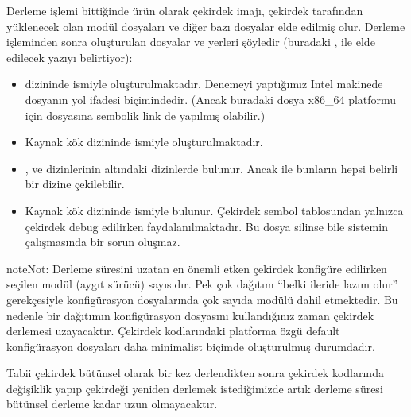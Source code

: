 \documentclass[a4paper,10pt,turkish]{sphinxmanual}
\begin{document}
\sphinxAtStartPar
Derleme işlemi bittiğinde ürün olarak çekirdek imajı, çekirdek tarafından yüklenecek olan modül
dosyaları ve diğer bazı dosyalar elde edilmiş olur. Derleme işleminden sonra oluşturulan dosyalar
ve yerleri şöyledir (buradaki ,  ile elde edilecek yazıyı
belirtiyor):
\begin{itemize}
\item {} 
\sphinxAtStartPar
{}  dizininde  ismiyle
oluşturulmaktadır. Denemeyi yaptığımız Intel makinede dosyanın yol ifadesi
 biçimindedir. (Ancak buradaki dosya x86\_64 platformu için
 dosyasına sembolik link de yapılmış olabilir.)

\item {} 
\sphinxAtStartPar
{} Kaynak kök dizininde  ismiyle
oluşturulmaktadır.

\item {} 
\sphinxAtStartPar
{} ,  ve  dizinlerinin
altındaki dizinlerde bulunur. Ancak  ile bunların hepsi belirli bir
dizine çekilebilir.

\item {} 
\sphinxAtStartPar
{} Kaynak kök dizininde  ismiyle bulunur. Çekirdek sembol
tablosundan yalnızca çekirdek debug edilirken faydalanılmaktadır. Bu dosya silinse bile sistemin
çalışmasında bir sorun oluşmaz.

\end{itemize}

\begin{sphinxadmonition}{note}{Not:}
\sphinxAtStartPar
Derleme süresini uzatan en önemli etken çekirdek konfigüre edilirken seçilen modül (aygıt sürücü)
sayısıdır. Pek çok dağıtım “belki ileride lazım olur” gerekçesiyle konfigürasyon dosyalarında
çok sayıda modülü dahil etmektedir. Bu nedenle bir dağıtımın konfigürasyon dosyasını kullandığınız
zaman çekirdek derlemesi uzayacaktır. Çekirdek kodlarındaki platforma özgü default konfigürasyon
dosyaları daha minimalist biçimde oluşturulmuş durumdadır.

\sphinxAtStartPar
Tabii çekirdek bütünsel olarak bir kez derlendikten sonra çekirdek kodlarında değişiklik yapıp
çekirdeği yeniden derlemek istediğimizde artık derleme süresi bütünsel derleme kadar uzun
olmayacaktır.
\end{sphinxadmonition}
\end{document}
